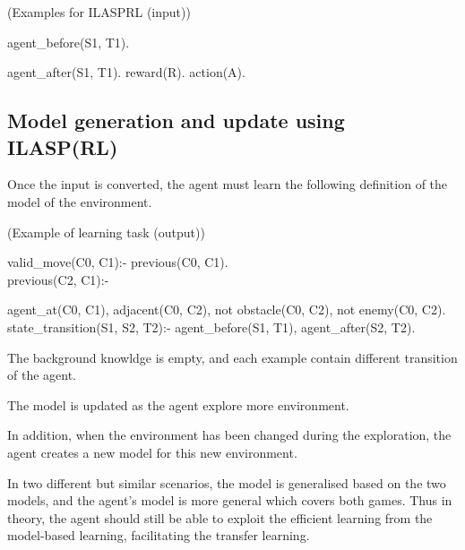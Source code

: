 \documentclass[12pt,twoside]{report}
\begin{document}
\begin{examp} (Examples for ILASPRL (input))

agent\_before(S1, T1).

agent\_after(S1, T1).
reward(R).
action(A).

\end{examp}
\label{ilasprl_input}

\subsection{Model generation and update using ILASP(RL)}

Once the input is converted, the agent must learn the following definition of the model of the environment.

\begin{examp} (Example of learning task (output))

valid\_move(C0, C1):- previous(C0, C1).
\\
previous(C2, C1):-

agent\_at(C0, C1),
adjacent(C0, C2),
not obstacle(C0, C2),
not enemy(C0, C2).
\\
state\_transition(S1, S2, T2):-
  agent\_before(S1, T1),
  agent\_after(S2, T2).

\end{examp}
\label{learning_task}

The background knowldge is empty, and each example contain different transition of the agent.

The model is updated as the agent explore more environment.


In addition, when the environment has been changed during the exploration, the agent creates a new model for this new environment.


In two different but similar scenarios, the model is generalised based on the two models, and the agent's model is more general which covers both games. Thus in theory, the agent should still be able to exploit the efficient learning from the model-based learning, facilitating the transfer learning.
\end{document}
